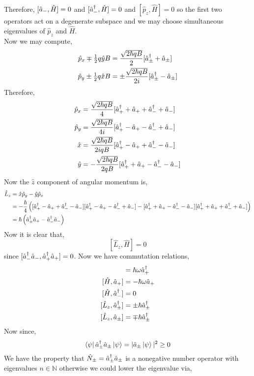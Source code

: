 \documentclass[12pt]{extarticle}
\newcommand{\N}{\mathbb{N}}
\theoremstyle{definition}
\begin{document}
Therefore, $[\hat{a}_{-}, \hat{H}] = 0$ and $[\hat{a}^\dagger_{-}, \hat{H}] = 0$ and $[\hat{p}_z, \hat{H}]  = 0$ so the first two operators act on a degenerate subspace and we may choose simultaneous eigenvalues of $\hat{p}_z$ and $\hat{H}$. 
\bigskip\\
Now we may compute,
\begin{align*}
\hat{p}_x \mp \tfrac{1}{2} q \hat{y} B & = \frac{\sqrt{2 \hbar q B}}{2} [\hat{a}^\dagger_{\pm} + \hat{a}_{\pm}]
\\
\hat{p}_y \pm \tfrac{1}{2} q \hat{x} B & = \pm \frac{\sqrt{2 \hbar q B}}{2 i}  [\hat{a}^\dagger_{\pm} - \hat{a}_{\pm}]
\end{align*}
Therefore,
\begin{align*}
\hat{p}_x & = \frac{\sqrt{2 \hbar q B}}{4} [ \hat{a}^\dagger_+ + \hat{a}_+ + \hat{a}^\dagger_- + \hat{a}_- ]
\\
\hat{p}_y & = \frac{\sqrt{2 \hbar q B}}{4 i} [ \hat{a}^\dagger_+ - \hat{a}_+ - \hat{a}^\dagger_- + \hat{a}_- ]
\\
\hat{x} & = \frac{\sqrt{2 \hbar q B}}{2 i q B} [ \hat{a}^\dagger_+ - \hat{a}_+ + \hat{a}^\dagger_- - \hat{a}_- ]
\\
\hat{y} & = - \frac{\sqrt{2 \hbar q B}}{2 q B} [ \hat{a}^\dagger_+ + \hat{a}_+ - \hat{a}^\dagger_- - \hat{a}_- ]
\end{align*}
Now the $\hat{z}$ component of angular momentum is,
\begin{align*}
\hat{L}_z & = \hat{x} \hat{p}_y - \hat{y} \hat{p}_x 
\\
& = - \frac{\hbar}{4} \left( [ \hat{a}^\dagger_+ - \hat{a}_+ + \hat{a}^\dagger_- - \hat{a}_- ] [ \hat{a}^\dagger_+ - \hat{a}_+ - \hat{a}^\dagger_- + \hat{a}_- ] - [ \hat{a}^\dagger_+ + \hat{a}_+ - \hat{a}^\dagger_- - \hat{a}_- ] [ \hat{a}^\dagger_+ + \hat{a}_+ + \hat{a}^\dagger_- + \hat{a}_- ] \right)
\\
& = \hbar \left( \hat{a}^\dagger_{+} \hat{a}_{+} - \hat{a}^\dagger_{-} \hat{a}_{-} \right)
\end{align*}
Now it is clear that,
\[ [\hat{L}_z, \hat{H}] = 0 \]
since $[ \hat{a}^\dagger_{-} \hat{a}_{-}, \hat{a}^\dagger_{+} \hat{a}_{+}] = 0$. Now we have commutation relations,
\begin{align*}
[\hat{H}, \adag_{+}] & = \hbar \omega \adag_{+}
\\
[\hat{H}, \a_{+}] & = -\hbar \omega \a_{+}
\\
[\hat{H}, \adag_{-}] & = 0
\\
[\hat{L}_z, \adag_{\pm}] & = \pm \hbar \adag_{\pm}
\\
[\hat{L}_z, \a_{\pm}] & = \mp \hbar \adag_{\pm}
\end{align*}
Now since,
\[ \left< \psi \right| \hat{a}^\dagger_{\pm} \hat{a}_{\pm} \left| \psi \right> = | \hat{a}_{\pm} \left| \psi \right> |^2 \ge 0 \]
We have the property that $\hat{N}_{\pm} = \hat{a}^\dagger_{\pm} \hat{a}_{\pm}$ is a nonegative number operator with eigenvalues $n \in \N$ otherwise we could lower the eigenvalue via,
\end{document}
